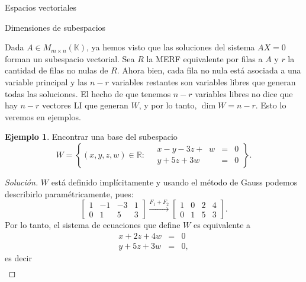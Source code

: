 \documentclass[a4paper,12pt,twoside,spanish,reqno]{amsbook}
\theoremstyle{definition}
\newtheorem{ejemplo}{Ejemplo}[section]
\theoremstyle{remark}
\newcommand{\K}{\mathbb K}
\begin{document}
\begin{chapter}{Espacios vectoriales}
    
    \begin{section}{Dimensiones de subespacios}\label{sec-dimensiones-de-subespacios}
        
            
        Dada $A \in M_{m\times n}(\K)$,  ya hemos visto que  las soluciones del sistema $AX=0$ forman un subespacio vectorial. Sea $R $ la MERF equivalente por filas a $A$ y $r$ la cantidad de filas no nulas de $R$. Ahora bien, cada fila no nula está asociada  a una  variable principal y las  $n-r$ variables restantes son variables libres  que generan  todas las soluciones.
        El  hecho de que tenemos $n-r$ variables libres no dice que hay $n-r$ vectores LI que generan $W$, y por lo tanto,  $\dim W = n-r$. Esto lo veremos en ejemplos.
        
        \begin{ejemplo}
            Encontrar una base del subespacio 
            $$
            W = \left\{(x,y,z,w) \in \mathbb{R}: \quad\begin{array}{rcl}
            x-y -3z +\;\;w &=& 0 \\ y +5z +3w &=& 0
            \end{array} \right\}.
            $$
        \end{ejemplo}
        \begin{proof}[Solución]
            $W$  está definido implícitamente y usando el método de Gauss podemos describirlo paramétricamente, pues:
            \begin{equation*}
            \begin{bmatrix}1&-1&-3&1 \\ 0&1&5&3  \end{bmatrix}
            \stackrel{F_1+F_2}{\longrightarrow} 
            \begin{bmatrix}1&0&2&4 \\ 0&1&5&3  \end{bmatrix}.
            \end{equation*}
            Por lo tanto, el sistema de ecuaciones que define $W$ es equivalente a 
            \begin{equation*}
            \begin{array}{rcl}
            x  +2z +4w &=& 0 \\ y +5z +3w &=& 0,
            \end{array}
            \end{equation*}
            es decir 
            \begin{equation*}
            \begin{array}{rcl}

\end{array}
\end{equation*}
\end{proof}
\end{section}
\end{chapter}
\end{document}

